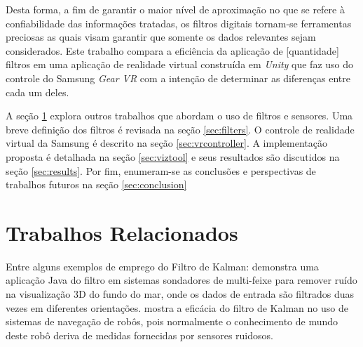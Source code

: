\documentclass[conference]{IEEEtran}
\begin{document}
Desta forma, a fim de garantir o maior nível de aproximação no que se refere à confiabilidade das informações tratadas, os filtros digitais tornam-se ferramentas preciosas as quais visam garantir que somente os dados relevantes sejam considerados. Este trabalho compara a eficiência da aplicação de [quantidade] filtros em uma aplicação de realidade virtual construída em \textit{Unity} que faz uso do controle do Samsung \textit{Gear VR} com a intenção de determinar as diferenças entre cada um deles.

A seção \ref{sec:relatedworks} explora outros trabalhos que abordam o uso de filtros e sensores. Uma breve definição dos filtros é revisada na seção \ref{sec:filters}. O controle de realidade virtual da Samsung é descrito na seção \ref{sec:vrcontroller}. A implementação proposta é detalhada na seção \ref{sec:viztool} e seus resultados são discutidos na seção \ref{sec:results}. Por fim, enumeram-se as conclusões e perspectivas de trabalhos futuros na seção \ref{sec:conclusion}

\section{Trabalhos Relacionados} \label{sec:relatedworks}

Entre alguns exemplos de emprego do Filtro de Kalman: \cite{demkowiczkalman} demonstra uma aplicação Java do filtro em sistemas sondadores de multi-feixe para remover ruído na visualização 3D do fundo do mar, onde os dados de entrada são filtrados duas vezes em diferentes orientações. \cite{choset2005principles} mostra a eficácia do filtro de Kalman no uso de sistemas de navegação de robôs, pois normalmente o conhecimento de mundo deste robô deriva de medidas fornecidas por sensores ruidosos.
\end{document}
